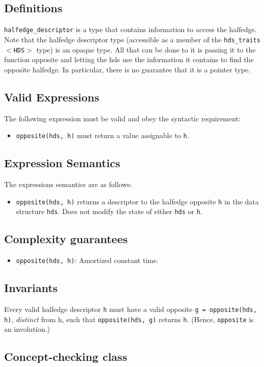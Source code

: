 \subsection{Definitions}\label{hdsconcept_refhdsconcept5}
{\tt halfedge\_\-descriptor} is a type that contains information to access the halfedge. Note that the halfedge descriptor type (accessible as a member of the {\tt hds\_\-traits$<$HDS$>$} type) is an opaque type. All that can be done to it is passing it to the function opposite and letting the hds use the information it contains to find the opposite halfedge. In particular, there is no guarantee that it is a pointer type.\subsection{Valid Expressions}\label{hdsconcept_refhdsconcept6}
The following expression must be valid and obey the syntactic requirement:\begin{itemize}
\item {\tt opposite(hds, h)} must return a value assignable to {\tt h}.\end{itemize}
\subsection{Expression Semantics}\label{hdsconcept_refhdsconcept7}
The expressions semantics are as follows:\begin{itemize}
\item {\tt opposite(hds, h)} returns a descriptor to the halfedge opposite {\tt h} in the data structure {\tt hds}. Does not modify the state of either {\tt hds} or {\tt h}.\end{itemize}
\subsection{Complexity guarantees}\label{hdsconcept_refhdsconcept8}
\begin{itemize}
\item {\tt opposite(hds, h)}: Amortized constant time.\end{itemize}
\subsection{Invariants}\label{hdsconcept_refhdsconcept9}
Every valid halfedge descriptor {\tt h} must have a valid opposite {\tt g = opposite(hds, h)}, {\em distinct\/} from h, such that {\tt opposite(hds, g)} returns {\tt h}. (Hence, {\tt opposite} is an involution.)\subsection{Concept-checking class}\label{hdsconcept_refhdsconcept10}


